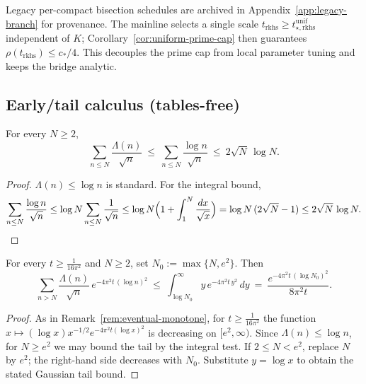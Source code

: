 \begin{remark}\label{rem:uniform-vs-local-full}
Legacy per-compact bisection schedules are archived in Appendix~\ref{app:legacy-branch} for provenance.
The mainline selects a single scale \(t_{\mathrm{rkhs}}\ge t_{\star,\mathrm{rkhs}}^{\mathrm{unif}}\)
independent of \(K\); Corollary~\ref{cor:uniform-prime-cap} then guarantees
\(\rho(t_{\mathrm{rkhs}})\le c_*/4\). This decouples the prime cap from local parameter tuning
and keeps the bridge analytic.
\end{remark}

\subsection*{Early/tail calculus (tables-free)}

\begin{lemma}\label{lem:rkhs-early}
For every $N\ge2$,
\[
\sum_{n\le N}\frac{\Lambda(n)}{\sqrt{n}}
\ \le\ \sum_{n\le N}\frac{\log n}{\sqrt{n}}
\ \le\ 2\sqrt{N}\,\log N.
\]
\end{lemma}

\begin{proof}
$\Lambda(n)\le\log n$ is standard. For the integral bound,
\[
\sum_{n\le N}\frac{\log n}{\sqrt{n}}
\le \log N \sum_{n\le N}\frac{1}{\sqrt{n}}
\le \log N\Bigl(1+\int_{1}^{N}\frac{dx}{\sqrt{x}}\Bigr)
= \log N\,(2\sqrt{N}-1)
\le 2\sqrt{N}\,\log N.
\]
\end{proof}

\begin{lemma}\label{lem:rkhs-tail}
For every $t\ge \tfrac{1}{16\pi^2}$ and $N\ge2$, set $N_0:=\max\{N,e^2\}$. Then
\[
\sum_{n>N}\frac{\Lambda(n)}{\sqrt{n}}\,e^{-4\pi^2 t\,(\log n)^2}
\ \le\ \int_{\log N_0}^{\infty} y\,e^{-4\pi^2 t\,y^2}\,dy
\ =\ \frac{e^{-4\pi^2 t\,(\log N_0)^2}}{8\pi^2 t}.
\]
\end{lemma}

\begin{proof}
As in Remark~\ref{rem:eventual-monotone}, for $t\ge \tfrac{1}{16\pi^2}$ the function
$x\mapsto (\log x)x^{-1/2}e^{-4\pi^2 t(\log x)^2}$ is decreasing on $[e^2,\infty)$.
Since $\Lambda(n)\le\log n$, for $N\ge e^2$ we may bound the tail by the integral test.
If $2\le N<e^2$, replace $N$ by $e^2$; the right-hand side decreases with $N_0$.
Substitute $y=\log x$ to obtain the stated Gaussian tail bound.
\end{proof}

